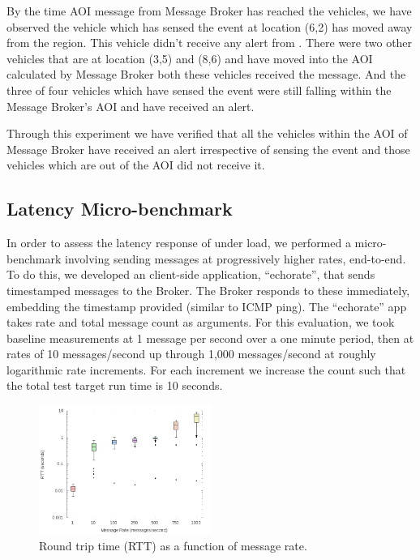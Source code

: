By the time AOI message from Message Broker has reached the vehicles,
we have observed the vehicle which has sensed the event at location
(6,2) has moved away from the region. This vehicle didn't receive any
alert from \name.  There were two other vehicles that are at
location (3,5) and (8,6) and have moved into the AOI calculated by
Message Broker both these vehicles received the message. And the three
of four vehicles which have sensed the event were still falling within
the Message Broker's AOI and have received an alert.
   
Through this experiment we have verified that all the vehicles within the
AOI of Message Broker have received an alert irrespective of sensing
the event and those vehicles which are out of the AOI did not receive it.

\subsection{Latency Micro-benchmark}

In order to assess the latency response of \name{} under load, we
performed a micro-benchmark involving sending messages at
progressively higher rates, end-to-end. To do this, we developed an
client-side application, ``echorate'', that sends timestamped messages
to the Broker. The Broker responds to these immediately, embedding the
timestamp provided (similar to ICMP ping). The ``echorate'' app takes
rate and total message count as arguments. For this evaluation, we
took baseline measurements at 1 message per second over a one minute
period, then at rates of 10 messages/second up through 1,000
messages/second at roughly logarithmic rate increments. For each increment
we increase the count such that the total test target run time is
10 seconds.

\begin{figure}[ht]
  \begin{center}
    \includegraphics[width=0.5\textwidth]{figs/RTT.png}
    \caption{Round trip time (RTT) as a function of message rate.}
    \label{fig:RTT}
  \end{center}
\end{figure}

